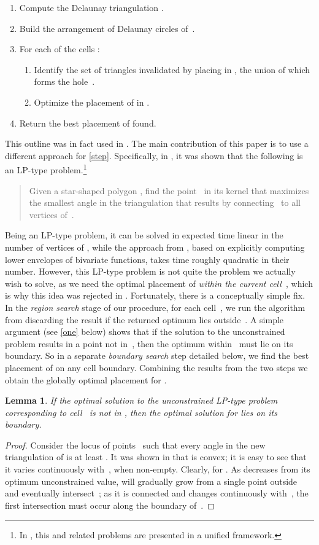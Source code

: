 \documentclass{cccg13}
\newtheorem{lemma}{Lemma}
\begin{document}
\begin{enumerate}
\item Compute the Delaunay triangulation .
\item Build the arrangement  of Delaunay circles of~.
\item For each of the  cells :
  \begin{enumerate}
  \item Identify the set of  triangles invalidated by placing  in , the union of which
  	forms the hole~.
  \item Optimize the placement of  in . \label{step}
  \end{enumerate}
\item Return the best placement of  found.
\end{enumerate}
This outline was in fact used in \cite{orig}.  The main contribution of this paper is to use a different approach for \autoref{step}.  Specifically, in \cite{lp}, it was shown that the following is an LP-type problem.\footnote{In \cite{quasi-convex}, this and related problems are presented in a unified framework.}
\begin{quote}
Given a star-shaped polygon , find the point~ in its kernel that maximizes the smallest angle in the triangulation that results by connecting~ to all vertices of~.
\end{quote}
Being an LP-type problem, it can be solved in expected time linear in the number of vertices of , while the approach from \cite{orig}, based on explicitly computing lower envelopes of bivariate functions, takes time roughly quadratic in their number.  However, this LP-type problem is not quite the problem we actually wish to solve, as we need the optimal placement of  \emph{within the current cell~}, which is why this idea was rejected in \cite{orig}.  Fortunately, there is a conceptually simple fix.  In the \emph{region search} stage of our procedure, for each cell~, we run the algorithm from \cite{lp} discarding the result if the returned optimum lies outside~.  A simple argument (see \autoref{one} below) shows that if the solution to the unconstrained problem results in a point not in~, then the optimum within~ must lie on its boundary.  So in a separate \emph{boundary search} step detailed below, we find the best placement of  on any cell boundary.  Combining the results from the two steps we obtain the globally optimal placement for .

\begin{lemma}\label{one}  If the optimal solution to the unconstrained LP-type problem corresponding to cell~ is not in , then the optimal solution for  lies on its boundary.\end{lemma}
\begin{proof} Consider the locus  of points~ such that every angle in the new triangulation of  is at least .  It was shown in \cite{lp} that  is convex; it is easy to see that it varies continuously with~, when non-empty.  Clearly,  for .  As  decreases from its optimum unconstrained value,  will gradually grow from a single point outside~ and eventually intersect~; as it is connected and changes continuously with~, the first intersection must occur along the boundary of~.\end{proof}
\end{document}
